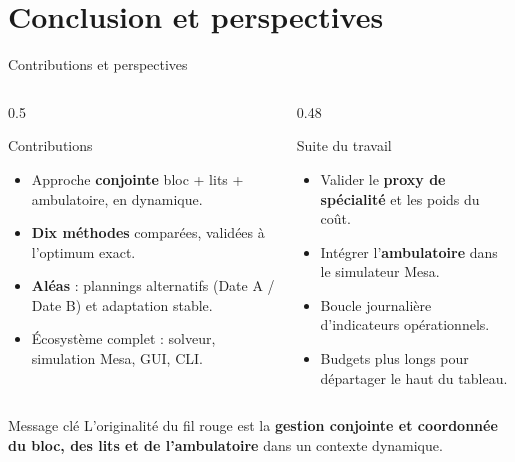 \section{Conclusion et perspectives}

\begin{frame}{Contributions et perspectives}
  \footnotesize
  \begin{columns}[T,onlytextwidth]
    \begin{column}{0.5\textwidth}
      \begin{exampleblock}{Contributions}
        \begin{itemize}
          \item Approche \textbf{conjointe} bloc + lits + ambulatoire, en
            dynamique.
          \item \textbf{Dix méthodes} comparées, validées à l'optimum exact.
          \item \textbf{Aléas} : plannings alternatifs (Date A / Date B) et
            adaptation stable.
          \item Écosystème complet : solveur, simulation Mesa, GUI, CLI.
        \end{itemize}
      \end{exampleblock}
    \end{column}
    \begin{column}{0.48\textwidth}
      \begin{alertblock}{Suite du travail}
        \begin{itemize}
          \item Valider le \textbf{proxy de spécialité} et les poids du coût.
          \item Intégrer l'\textbf{ambulatoire} dans le simulateur Mesa.
          \item Boucle journalière d'indicateurs opérationnels.
          \item Budgets plus longs pour départager le haut du tableau.
        \end{itemize}
      \end{alertblock}
    \end{column}
  \end{columns}

  \vspace{0.15cm}
  \begin{block}{Message clé}
    \centering
    L'originalité du fil rouge est la \textbf{gestion conjointe et coordonnée
    du bloc, des lits et de l'ambulatoire} dans un contexte dynamique.
  \end{block}
\end{frame}

